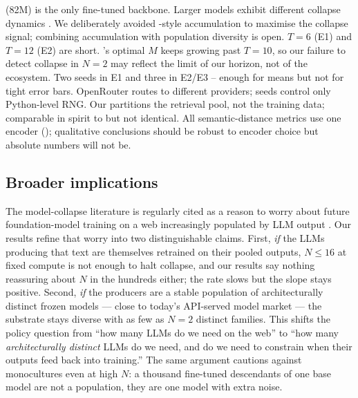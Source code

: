  \distilgpt (82M) is the only fine-tuned backbone.
Larger models exhibit different collapse dynamics
\citep{dohmatob2024tale, hodel2026epistemic}.
 We deliberately avoided
\citet{gerstgrasser2024accumulating}-style accumulation to maximise the
collapse signal; combining accumulation with population diversity is
open.
 $T{=}6$ (E1) and $T{=}12$ (E2) are short.
\citet{hodel2026epistemic}'s optimal $M$ keeps growing past $T{=}10$,
so our failure to detect collapse in $N{=}2$ \rag may reflect the
limit of our horizon, not of the ecosystem.
 Two seeds in E1 and three in E2/E3 -- enough
for means but not for tight error bars.
 OpenRouter routes to different providers;
seeds control only Python-level RNG.
 Our \axisdata partitions
the retrieval pool, not the training data; comparable in spirit to
\citet{hodel2026epistemic} but not identical.
 All semantic-distance metrics use one
encoder (\minilm); qualitative conclusions should be robust to
encoder choice but absolute numbers will not be.

\subsection{Broader implications}

The model-collapse literature is regularly cited as a reason to worry
about future foundation-model training on a web increasingly populated
by LLM output \citep{shumailov2024nature, dohmatob2024tale}. Our
results refine that worry into two distinguishable claims. First,
\emph{if} the LLMs producing that text are themselves retrained on
their pooled outputs, $N \le 16$ at fixed compute is not enough to
halt collapse, and our results say nothing reassuring about $N$ in the
hundreds either; the rate slows but the slope stays positive. Second,
\emph{if} the producers are a stable population of architecturally
distinct frozen models --- close to today's API-served model market ---
the substrate stays diverse with as few as $N{=}2$ distinct families.
This shifts the policy question from ``how many LLMs do we need on the
web'' to ``how many \emph{architecturally distinct} LLMs do we need,
and do we need to constrain when their outputs feed back into
training.'' The same argument cautions against monocultures even at
high $N$: a thousand fine-tuned descendants of one base model are not
a population, they are one model with extra noise.
